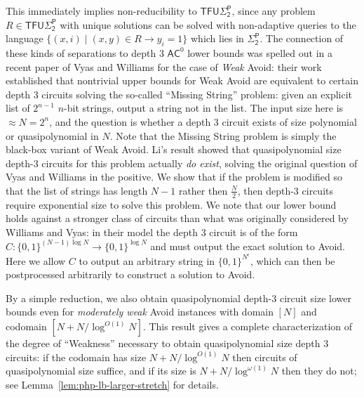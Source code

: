 \documentclass[11pt]{article}
\newcommand{\todo}[1]{\textcolor{red}{TODO: #1}}
\newcommand{\B}{\{0,1\}}
\begin{document}
This immediately implies non-reducibility to $\mathsf{TFU\Sigma_2^P}$, since any problem $R \in \mathsf{TFU\Sigma_2^P}$ with unique solutions can be solved with non-adaptive queries to the language $\{(x,i) \mid (x,y) \in R \rightarrow y_i=1\}$ which lies in $\mathsf{\Sigma_2^P}$. The connection of these kinds of separations to depth 3 $\mathsf{AC}^0$ lower bounds was spelled out in a recent paper of Vyas and Williams \cite{vyas-williams} for the case of \emph{Weak} Avoid: their work established that nontrivial upper bounds for Weak Avoid are equivalent to certain depth 3 circuits solving the so-called ``Missing String'' problem: given an explicit list of $2^{n-1}$ $n$-bit strings, output a string not in the list. The input size here is $\approx N=2^n$, and the question is whether a depth 3 circuit exists of size polynomial or quasipolynomial in $N$. Note that the Missing String problem is simply the black-box variant of Weak Avoid. Li's result showed that quasipolynomial size depth-3 circuits for this problem actually \emph{do exist}, solving the original question of Vyas and Williams in the positive. We show that if the problem is modified so that the list of strings has length $N-1$ rather then $\frac{N}{2}$, then depth-3 circuits require exponential size to solve this problem. We note that our lower bound holds against a stronger class of circuits than what was originally considered by Williams and Vyas: in their model the depth 3 circuit is of the form $ C:\B^{(N-1) \log N } \to \B^{ \log N}$ and must output the exact solution to Avoid. Here we allow $C$ to output an arbitrary string in $\B^{N^{\epsilon}}$, which can then be postprocessed arbitrarily to construct a solution to Avoid.

By a simple reduction, we also obtain quasipolynomial depth-3 circuit size lower bounds even for \emph{moderately weak} Avoid instances with domain $[N]$ and codomain $[N + N/\log^{O(1)} N]$. This result gives a complete characterization of the degree of ``Weakness'' necessary to obtain quasipolynomial size depth 3 circuits: if the codomain has size $N + N/\log^{O(1)} N$ then circuits of quasipolynomial size suffice, and if its size is $N + N/\log^{\omega(1)}N$ then they do not; see Lemma~\ref{lem:php-lb-larger-stretch} for details.
\end{document}

